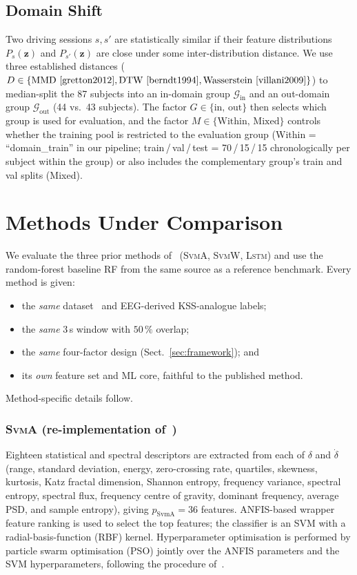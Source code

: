 \documentclass[lettersize,journal]{IEEEtran}
\newcommand{\Impl}[1]{\textsc{#1}}
\begin{document}
\subsection{Domain Shift}\label{sec:domain_shift}
Two driving sessions $s, s'$ are statistically similar if their feature distributions $P_s(\mathbf{z})$ and $P_{s'}(\mathbf{z})$ are close under some inter-distribution distance.
We use three established distances ($D \in \{\mathrm{MMD}~\cite{gretton2012}, \mathrm{DTW}~\cite{berndt1994}, \mathrm{Wasserstein}~\cite{villani2009}\}$) to median-split the 87 subjects into an in-domain group $\mathcal{G}_{\mathrm{in}}$ and an out-domain group $\mathcal{G}_{\mathrm{out}}$ (44 vs.\ 43 subjects).
The factor $G \in \{\mathrm{in},\,\mathrm{out}\}$ then selects which group is used for evaluation, and the factor $M \in \{\mathrm{Within},\,\mathrm{Mixed}\}$ controls whether the training pool is restricted to the evaluation group (Within = ``domain\_train'' in our pipeline; train\,/\,val\,/\,test = 70\,/\,15\,/\,15 chronologically per subject within the group) or also includes the complementary group's train and val splits (Mixed).

\section{Methods Under Comparison}
\label{sec:methods_under_test}
We evaluate the three prior methods of~\cite{nakagama2025iv} (\Impl{SvmA}, \Impl{SvmW}, \Impl{Lstm}) and use the random-forest baseline \Impl{RF} from the same source as a reference benchmark.
Every method is given:
\begin{itemize}
\item the \emph{same} dataset~\cite{aygun2024} and EEG-derived KSS-analogue labels;
\item the \emph{same} $3$\,s window with $50\,\%$ overlap;
\item the \emph{same} four-factor design (Sect.~\ref{sec:framework}); and
\item its \emph{own} feature set and ML core, faithful to the published method.
\end{itemize}
Method-specific details follow.

\subsubsection{\Impl{SvmA} (re-implementation of~\cite{arefnezhad2019})}\label{sec:svma}
Eighteen statistical and spectral descriptors are extracted from each of $\delta$ and $\dot{\delta}$ (range, standard deviation, energy, zero-crossing rate, quartiles, skewness, kurtosis, Katz fractal dimension, Shannon entropy, frequency variance, spectral entropy, spectral flux, frequency centre of gravity, dominant frequency, average PSD, and sample entropy), giving $p_{\text{SvmA}} = 36$ features.
ANFIS-based wrapper feature ranking is used to select the top features; the classifier is an SVM with a radial-basis-function (RBF) kernel.
Hyperparameter optimisation is performed by particle swarm optimisation (PSO) jointly over the ANFIS parameters and the SVM hyperparameters, following the procedure of~\cite{arefnezhad2019}.
\end{document}
